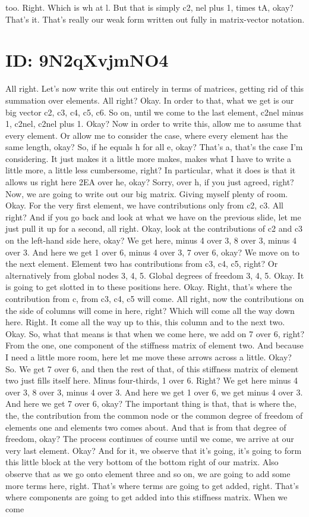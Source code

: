 \documentclass[10pt]{article}
\begin{document}
{too. Right. Which is wh at l. But that is simply c2, nel plus 1, times tA, okay? That's it. That's really our weak form written out fully in matrix-vector notation.

\section*{ID: 9N2qXvjmNO4}
All right. Let's now write this out entirely in terms of matrices, getting rid of this summation over elements. All right? Okay. In order to that, what we get is our big vector c2, c3, c4, c5, c6. So on, until we come to the last element, c2nel minus 1, c2nel, c2nel plus 1. Okay? Now in order to write this, allow me to assume that every element. Or allow me to consider the case, where every element has the same length, okay? So, if he equals h for all e, okay? That's a, that's the case I'm considering. It just makes it a little more makes, makes what I have to write a little more, a little less cumbersome, right? In particular, what it does is that it allows us right here 2EA over he, okay? Sorry, over h, if you just agreed,  right? Now, we are going to write out our big matrix. Giving myself plenty of room. Okay. For the very first element, we have contributions only from c2, c3. All right? And if you go back and look at what we have on the previous slide, let me just pull it up for a second, all right. Okay, look at the contributions of c2 and c3 on the left-hand side here, okay? We get here, minus 4 over 3, 8 over 3, minus 4 over 3. And here we get 1 over 6, minus 4 over 3, 7 over 6, okay? We move on to the next element. Element two has contributions from c3, c4, c5, right? Or alternatively from global nodes 3, 4, 5. Global degrees of freedom 3, 4, 5. Okay. It is going to get slotted in to these positions here. Okay. Right, that's where the contribution from c, from c3, c4, c5 will come. All right, now the contributions on the side of columns will come in here, right? Which will come all the way down here. Right. It come all the way up to this, this column and to the next two. Okay. So, what that means is that when we come here, we add on 7 over 6, right? From the one, one component of the stiffness matrix of element two. And because I need a little more room, here let me move these arrows across a little. Okay? So. We get 7 over 6, and then the rest of that, of this stiffness matrix of element two just fills itself here. Minus four-thirds, 1 over 6. Right? We get here minus 4 over 3, 8 over 3, minus 4 over 3. And here we get 1 over 6, we get minus 4 over 3. And here we get 7 over 6, okay? The important thing is that, that is where the, the, the contribution from the common node or the common degree of freedom of elements one and elements two comes about. And that is from that degree of freedom, okay? The process continues of course until we come, we arrive at our very last element. Okay? And for it, we observe that it's going, it's going to form this little block at the very bottom of the bottom right of our matrix. Also observe that as we go onto element three and so on, we are going to add some more terms here, right. That's where terms are going to get added, right. That's where components are going to get added into this stiffness matrix. When we come }
\end{document}
